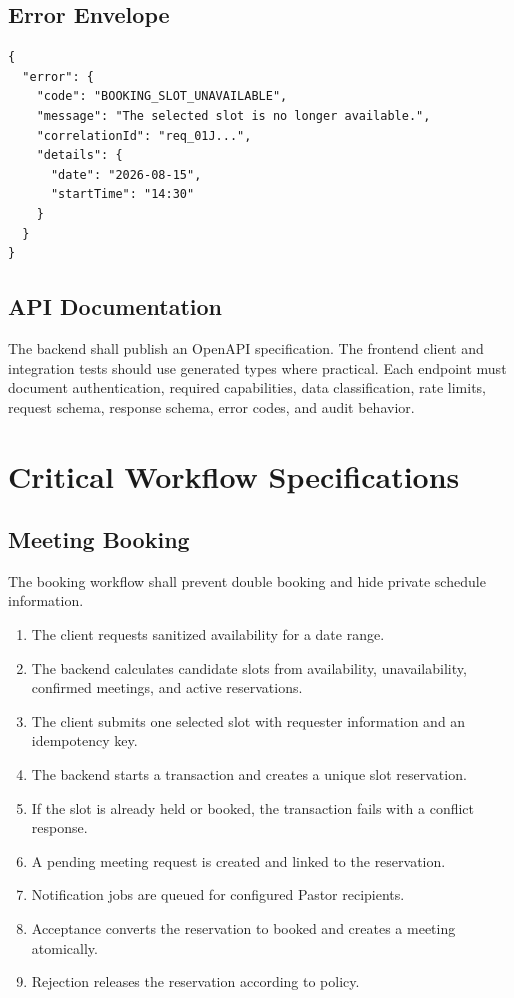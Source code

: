 \documentclass[11pt,a4paper,oneside]{report}
\begin{document}
\section{Error Envelope}

\begin{lstlisting}[caption={Standard API error response}]
{
  "error": {
    "code": "BOOKING_SLOT_UNAVAILABLE",
    "message": "The selected slot is no longer available.",
    "correlationId": "req_01J...",
    "details": {
      "date": "2026-08-15",
      "startTime": "14:30"
    }
  }
}
\end{lstlisting}

\section{API Documentation}

The backend shall publish an OpenAPI specification. The frontend client and integration tests should use generated types where practical. Each endpoint must document authentication, required capabilities, data classification, rate limits, request schema, response schema, error codes, and audit behavior.

\chapter{Critical Workflow Specifications}

\section{Meeting Booking}

The booking workflow shall prevent double booking and hide private schedule information.

\begin{enumerate}
  \item The client requests sanitized availability for a date range.
  \item The backend calculates candidate slots from availability, unavailability, confirmed meetings, and active reservations.
  \item The client submits one selected slot with requester information and an idempotency key.
  \item The backend starts a transaction and creates a unique slot reservation.
  \item If the slot is already held or booked, the transaction fails with a conflict response.
  \item A pending meeting request is created and linked to the reservation.
  \item Notification jobs are queued for configured Pastor recipients.
  \item Acceptance converts the reservation to booked and creates a meeting atomically.
  \item Rejection releases the reservation according to policy.
\end{enumerate}
\end{document}
